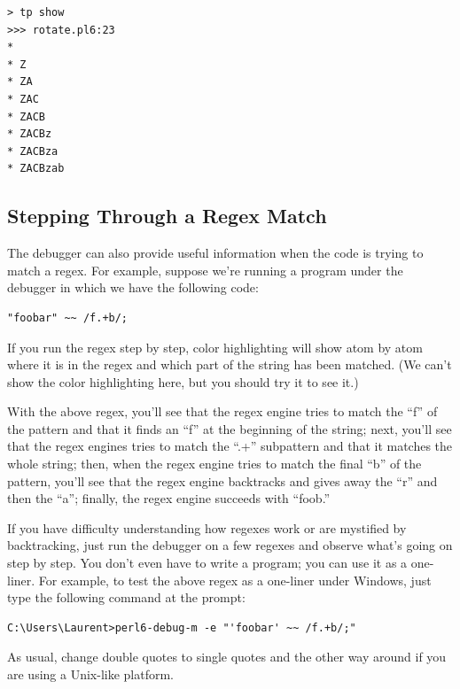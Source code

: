 \begin{verbatim}
> tp show
>>> rotate.pl6:23
*
* Z
* ZA
* ZAC
* ZACB
* ZACBz
* ZACBza
* ZACBzab
\end{verbatim}

\subsection{Stepping Through a Regex Match}
\label{regex-debugging}

The debugger can also provide useful information when the 
code is trying to match a regex. For example, suppose we're 
running a program under the debugger in which we have the 
following code:

\begin{verbatim}
"foobar" ~~ /f.+b/;
\end{verbatim}

If you run the regex step by step, color highlighting will show 
atom by atom where it is in the regex and which part of the 
string has been matched. (We can't show the color highlighting 
here, but you should try it to see it.)

With the above regex, you'll see that 
the regex engine tries to match the ``f'' of the pattern and that 
it finds an ``f'' at the beginning of the string; next, you'll see 
that the regex engines tries to match the ``.+'' subpattern and 
that it matches the whole string; then, when the regex engine 
tries to match the final ``b'' of the pattern, you'll see that 
the regex engine backtracks and gives away the ``r'' and then the 
``a''; finally, the regex engine succeeds with ``foob.''

If you have difficulty understanding how regexes work or are 
mystified by backtracking, just run the debugger on a few 
regexes and observe what's going on step by step. You don't 
even have to write a program; you can use it as a one-liner. 
For example, to test the above regex as a one-liner under  
Windows, just type the following command at the prompt:

\begin{verbatim}
C:\Users\Laurent>perl6-debug-m -e "'foobar' ~~ /f.+b/;"
\end{verbatim}

As usual, change double quotes to single quotes and the other 
way around if you are using a Unix-like platform.

